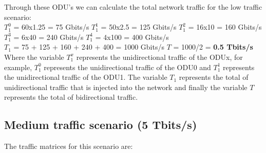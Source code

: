 \vspace{17pt}
Through these ODU's we can calculate the total network traffic for the low traffic scenario:\\

$T_1^0$ = 60x1.25 = 75 Gbits/s \qquad
$T_1^1$ = 50x2.5 = 125 Gbits/s \qquad
$T_1^2$ = 16x10 = 160 Gbits/s \\

$T_1^3$ = 6x40 = 240 Gbits/s \quad
$T_1^4$ = 4x100 = 400 Gbits/s \\

$T_{1}$ = 75 + 125 + 160 + 240 + 400 = 1000 Gbits/s \qquad
$T$ = 1000/2 = \textbf{0.5 Tbits/s}\\

Where the variable $T_1^x$ represents the unidirectional traffic of the ODUx, for example, $T_1^0$ represents the unidirectional traffic of the ODU0 and $T_1^1$ represents the unidirectional traffic of the ODU1. The variable $T_{1}$ represents the total of unidirectional traffic that is injected into the network and finally the variable $T$ represents the total of bidirectional traffic.\\

\subsection{Medium traffic scenario (5 Tbits/s)}\label{medium_traffic_scenario}

The traffic matrices for this scenario are:

